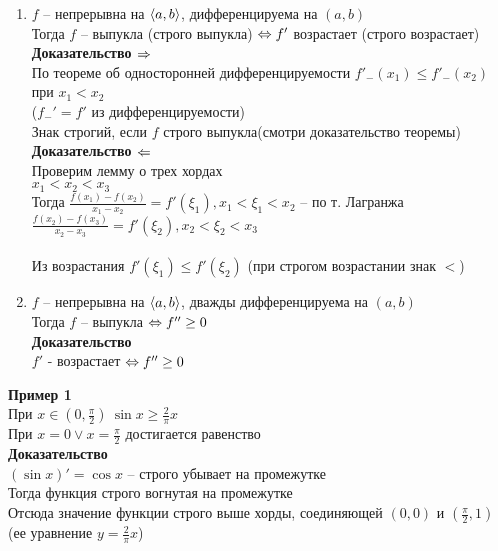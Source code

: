 \documentclass[12pt]{article}
\begin{document}
\begin{enumerate}
    \item $f$ -- непрерывна на $\langle a, b \rangle$, дифференцируема на $(a,b)$\\
    Тогда $f$ -- выпукла (строго выпукла) $\Leftrightarrow f'$ возрастает (строго возрастает)
    \textbf{Доказательство $\Rightarrow$}\\
    По теореме об односторонней дифференцируемости $f'_-(x_1) \leq f'_-(x_2)$ при $x_1 < x_2$\\
    ($f_-' = f'$ из дифференцируемости)\\
    Знак строгий, если $f$ строго выпукла(смотри доказательство теоремы)\\
    \textbf{Доказательство $\Leftarrow$}\\
    Проверим лемму о трех хордах\\
    $x_1 < x_2 < x_3$\\
    Тогда $\frac{f(x_1)-f(x_2)}{x_1-x_2} = f'(\xi_1), x_1 < \xi_1 < x_2$ -- по т. Лагранжа\\
    $\frac{f(x_2)-f(x_3)}{x_2-x_3} = f'(\xi_2), x_2 < \xi_2 < x_3$\\\\
    Из возрастания $f'(\xi_1) \leq f'(\xi_2)$ (при строгом возрастании знак $<$)
    \item $f$ -- непрерывна на $\langle a, b \rangle$, дважды дифференцируема на $(a,b)$\\
    Тогда $f$ -- выпукла $\Leftrightarrow f'' \geq 0$\\
    \textbf{Доказательство}\\
    $f'$ - возрастает $\Leftrightarrow f'' \geq 0$
\end{enumerate}
\textbf{Пример 1}\\
При $x \in (0, \frac \pi2)\ \sin x \geq \frac2\pi x$\\
При $x = 0 \lor x = \frac\pi2$ достигается равенство\\
\textbf{Доказательство}\\
$(\sin x)' = \cos x$ -- строго убывает на промежутке\\
Тогда функция строго вогнутая на промежутке\\
Отсюда значение функции строго выше хорды, соединяющей $(0, 0)$ и $(\frac\pi2, 1)$ (ее уравнение $y = \frac2\pi x$)
\end{document}
